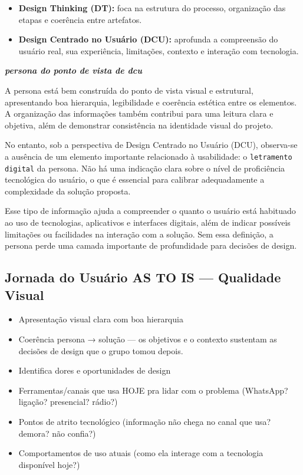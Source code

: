 \documentclass[
  sigconf,
  nonacm, %
  language=portuguese
]{acmart}
\newcommand{\statuswarn}[1]{{\small\bfseries\color{cwarn}#1}}
\begin{document}
\begin{itemize}[leftmargin=14pt,itemsep=2pt,topsep=4pt]
  \item \textbf{Design Thinking (DT):} foca na estrutura do processo, organização das etapas e coerência entre artefatos.
  \item \textbf{Design Centrado no Usuário (DCU):} aprofunda a compreensão do usuário real, sua experiência, limitações, contexto e interação com tecnologia.
\end{itemize}

\textit{\textbf{persona do ponto de vista de dcu}}

A persona está bem construída do ponto de vista visual e estrutural, apresentando boa hierarquia, legibilidade e coerência estética entre os elementos. A organização das informações também contribui para uma leitura clara e objetiva, além de demonstrar consistência na identidade visual do projeto.

No entanto, sob a perspectiva de Design Centrado no Usuário (DCU), observa-se a ausência de um elemento importante relacionado à usabilidade: o \texttt{letramento digital} da persona. Não há uma indicação clara sobre o nível de proficiência tecnológica do usuário, o que é essencial para calibrar adequadamente a complexidade da solução proposta.

Esse tipo de informação ajuda a compreender o quanto o usuário está habituado ao uso de tecnologias, aplicativos e interfaces digitais, além de indicar possíveis limitações ou facilidades na interação com a solução. Sem essa definição, a persona perde uma camada importante de profundidade para decisões de design.

\subsection{Jornada do Usuário AS TO IS — Qualidade Visual}

\noindent\statuswarn{0,98\,/\,1,50 pts · Faltou pouco}

\begin{itemize}[leftmargin=14pt,itemsep=1pt,topsep=3pt,parsep=0pt]
  \item[\textcolor{cgood}{$\checkmark$}] {\small\textcolor{cgood}{Apresentação visual clara com boa hierarquia}}
  \item[\textcolor{cgood}{$\checkmark$}] {\small\textcolor{cgood}{Coerência persona → solução — os objetivos e o contexto sustentam as decisões de design que o grupo tomou depois.}}
  \item[$\square$] {\small\textcolor{cmuted}{Identifica dores e oportunidades de design}}
  \item[$\square$] {\small\textcolor{cmuted}{Ferramentas/canais que usa HOJE pra lidar com o problema (WhatsApp? ligação? presencial? rádio?)}}
  \item[$\square$] {\small\textcolor{cmuted}{Pontos de atrito tecnológico (informação não chega no canal que usa? demora? não confia?)}}
  \item[\textcolor{cgood}{$\checkmark$}] {\small\textcolor{cgood}{Comportamentos de uso atuais (como ela interage com a tecnologia disponível hoje?)}}
\end{itemize}
\end{document}
